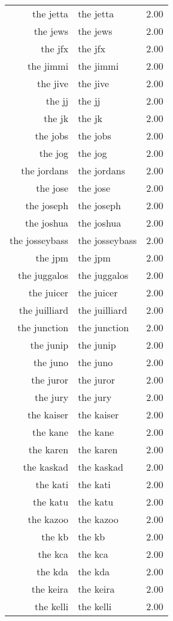 \begin{table}[ht]
\begin{tabular}{rlr}
  the jetta & the jetta & 2.00 \\ 
  the jews & the jews & 2.00 \\ 
  the jfx & the jfx & 2.00 \\ 
  the jimmi & the jimmi & 2.00 \\ 
  the jive & the jive & 2.00 \\ 
  the jj & the jj & 2.00 \\ 
  the jk & the jk & 2.00 \\ 
  the jobs & the jobs & 2.00 \\ 
  the jog & the jog & 2.00 \\ 
  the jordans & the jordans & 2.00 \\ 
  the jose & the jose & 2.00 \\ 
  the joseph & the joseph & 2.00 \\ 
  the joshua & the joshua & 2.00 \\ 
  the josseybass & the josseybass & 2.00 \\ 
  the jpm & the jpm & 2.00 \\ 
  the juggalos & the juggalos & 2.00 \\ 
  the juicer & the juicer & 2.00 \\ 
  the juilliard & the juilliard & 2.00 \\ 
  the junction & the junction & 2.00 \\ 
  the junip & the junip & 2.00 \\ 
  the juno & the juno & 2.00 \\ 
  the juror & the juror & 2.00 \\ 
  the jury & the jury & 2.00 \\ 
  the kaiser & the kaiser & 2.00 \\ 
  the kane & the kane & 2.00 \\ 
  the karen & the karen & 2.00 \\ 
  the kaskad & the kaskad & 2.00 \\ 
  the kati & the kati & 2.00 \\ 
  the katu & the katu & 2.00 \\ 
  the kazoo & the kazoo & 2.00 \\ 
  the kb & the kb & 2.00 \\ 
  the kca & the kca & 2.00 \\ 
  the kda & the kda & 2.00 \\ 
  the keira & the keira & 2.00 \\ 
  the kelli & the kelli & 2.00 \\ 

\end{tabular}
\end{table}

